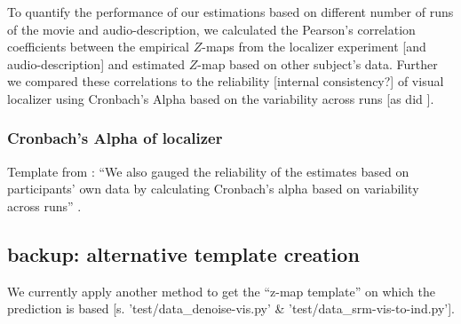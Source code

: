 %
To quantify the performance of our estimations based on different number of runs
of the movie and audio-description, we calculated the Pearson's correlation
coefficients between the empirical $Z$-maps from the localizer experiment [and
audio-description] and estimated $Z$-map based on other subject's data.
%
Further we compared these correlations to the reliability [internal
consistency?] of visual localizer using Cronbach's Alpha based on the
variability across runs [as did
\citep{jiahui2020predicting}].


\subsubsection{Cronbach's Alpha of localizer}


%
Template from \citet{jiahui2020predicting}: ``We also gauged the reliability of
the estimates based on participants' own data by calculating Cronbach's alpha
based on variability across runs'' \citep{jiahui2020predicting}.


\subsection{backup: alternative template creation}






%
We currently apply another method to get the ``z-map template'' on which the
prediction is based [s. 'test/data\_denoise-vis.py' \&
'test/data\_srm-vis-to-ind.py'].


